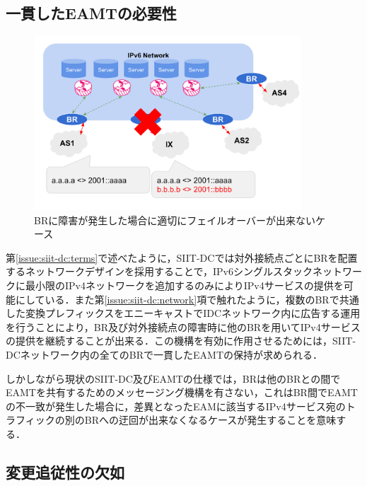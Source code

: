 \subsection{一貫したEAMTの必要性}
\label{issue:siit-dc_problems:consistent}

\begin{figure}[h]
    \begin{center}
      \includegraphics[width=10cm,pagebox=cropbox,clip]{img/siit-dc_can-not-failover.png}
    \end{center}
    \caption{BRに障害が発生した場合に適切にフェイルオーバーが出来ないケース}
    \label{fig:siit-dc_can-not-failover}
\end{figure}

第\ref{issue:siit-dc:terms}で述べたように，SIIT-DCでは対外接続点ごとにBRを配置するネットワークデザインを採用することで，IPv6シングルスタックネットワークに最小限のIPv4ネットワークを追加するのみによりIPv4サービスの提供を可能にしている．また第\ref{issue:siit-dc:network}項で触れたように，複数のBRで共通した変換プレフィックスをエニーキャストでIDCネットワーク内に広告する運用を行うことにより，BR及び対外接続点の障害時に他のBRを用いてIPv4サービスの提供を継続することが出来る．この機構を有効に作用させるためには，SIIT-DCネットワーク内の全てのBRで一貫したEAMTの保持が求められる．

しかしながら現状のSIIT-DC及びEAMTの仕様\cite{RFC7755,RFC7756,RFC7757}では，BRは他のBRとの間でEAMTを共有するためのメッセージング機構を有さない，これはBR間でEAMTの不一致が発生した場合に，差異となったEAMに該当するIPv4サービス宛のトラフィックの別のBRへの迂回が出来なくなるケースが発生することを意味する．


\subsection{変更追従性の欠如}

